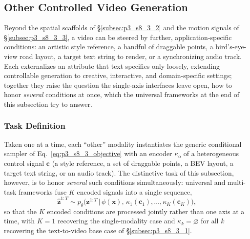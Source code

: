 


\subsection{Other Controlled Video Generation}
\label{subsec:p3_s8_3_4}

Beyond the spatial scaffolds of §\ref{subsec:p3_s8_3_2} and the motion signals of §\ref{subsec:p3_s8_3_3}, a video can be steered by further, application-specific conditions: an artistic style reference, a handful of draggable points, a bird's-eye-view road layout, a target text string to render, or a synchronizing audio track.
Each externalizes an attribute that text specifies only loosely, extending controllable generation to creative, interactive, and domain-specific settings; together they raise the question the single-axis interfaces leave open, how to honor \emph{several} conditions at once, which the universal frameworks at the end of this subsection try to answer.

\subsubsection{Task Definition}
\label{subsubsec:p3_s8_3_4_task}
Taken one at a time, each ``other'' modality instantiates the generic conditional sampler of Eq.~\eqref{eq:p3_s8_3_objective} with an encoder $\kappa_{\text{o}}$ of a heterogeneous control signal $\mathbf{c}$ (a style reference, a set of draggable points, a BEV layout, a target text string, or an audio track). The distinctive task of this subsection, however, is to honor \emph{several} such conditions simultaneously: universal and multi-task frameworks fuse $K$ encoded signals into a single sequence,
\begin{equation}
\hat{\mathbf{z}}^{1:T}\sim p_\theta\!\big(\mathbf{z}^{1:T}\,\big|\,\phi(\mathbf{x}),\,\kappa_1(\mathbf{c}_1),\dots,\kappa_K(\mathbf{c}_K)\big),
\label{eq:p3_s8_3_4_objective}
\end{equation}
so that the $K$ encoded conditions are processed jointly rather than one axis at a time, with $K=1$ recovering the single-modality case and $\kappa_k=\varnothing$ for all $k$ recovering the text-to-video base case of §\ref{subsec:p3_s8_3_1}.

